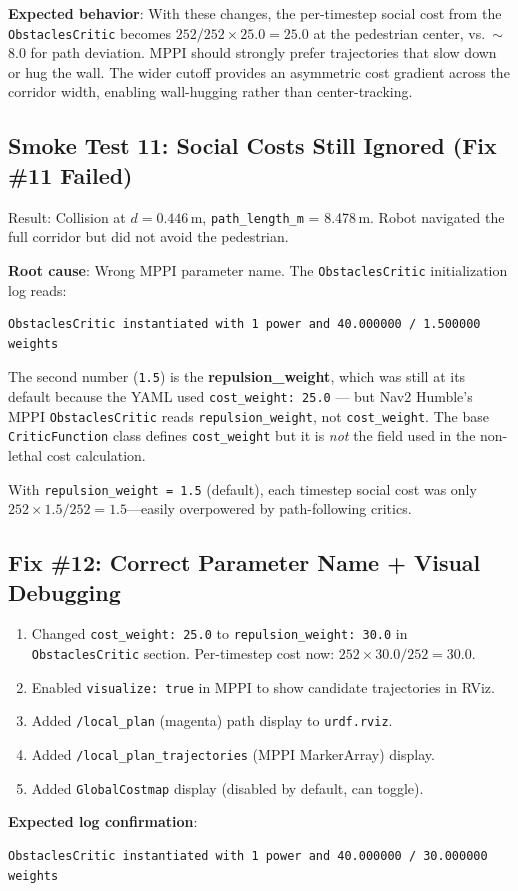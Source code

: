 \documentclass[11pt]{article}
\newcommand{\logentry}[1]{\subsection*{#1}}
\begin{document}
\textbf{Expected behavior}: With these changes, the per-timestep social cost from the
\texttt{ObstaclesCritic} becomes $252/252 \times 25.0 = 25.0$ at the pedestrian
center, vs.\ $\sim$8.0 for path deviation. MPPI should strongly prefer trajectories
that slow down or hug the wall. The wider cutoff provides an asymmetric cost gradient
across the corridor width, enabling wall-hugging rather than center-tracking.

\logentry{Smoke Test 11: Social Costs Still Ignored (Fix \#11 Failed)}
Result: Collision at $d = 0.446$\,m, \texttt{path\_length\_m} = 8.478\,m. Robot
navigated the full corridor but did not avoid the pedestrian.

\textbf{Root cause}: Wrong MPPI parameter name.  The \texttt{ObstaclesCritic}
initialization log reads:
\begin{verbatim}
ObstaclesCritic instantiated with 1 power and 40.000000 / 1.500000 weights
\end{verbatim}
The second number (\texttt{1.5}) is the \textbf{repulsion\_weight}, which was still
at its default because the YAML used \texttt{cost\_weight: 25.0} --- but
Nav2 Humble's MPPI \texttt{ObstaclesCritic} reads
\texttt{repulsion\_weight}, not \texttt{cost\_weight}. The base
\texttt{CriticFunction} class defines \texttt{cost\_weight} but it is
\emph{not} the field used in the non-lethal cost calculation.

With \texttt{repulsion\_weight = 1.5} (default), each timestep social cost was only
$252 \times 1.5 / 252 = 1.5$---easily overpowered by path-following critics.

\logentry{Fix \#12: Correct Parameter Name + Visual Debugging}
\begin{enumerate}
  \item Changed \texttt{cost\_weight: 25.0} to \texttt{repulsion\_weight: 30.0} in
        \texttt{ObstaclesCritic} section. Per-timestep cost now:
        $252 \times 30.0 / 252 = 30.0$.
  \item Enabled \texttt{visualize: true} in MPPI to show candidate trajectories in
        RViz.
  \item Added \texttt{/local\_plan} (magenta) path display to
        \texttt{urdf.rviz}.
  \item Added \texttt{/local\_plan\_trajectories} (MPPI MarkerArray) display.
  \item Added \texttt{GlobalCostmap} display (disabled by default, can toggle).
\end{enumerate}

\textbf{Expected log confirmation}:
\begin{verbatim}
ObstaclesCritic instantiated with 1 power and 40.000000 / 30.000000 weights
\end{verbatim}
\end{document}
